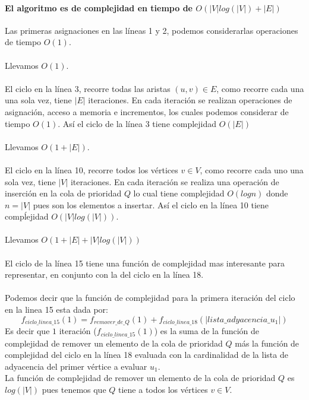 \documentclass[12pt]{article}
\begin{document}
\paragraph{El algoritmo es de complejidad en tiempo de $O(|V|log(|V|) + |E|)$}
Las primeras asignaciones en las líneas 1 y 2, podemos considerarlas operaciones de tiempo $O(1)$.\\\\
Llevamos $O(1)$.\\\\
El ciclo en la línea 3, recorre todas las aristas $(u,v)\in E$, como recorre cada una una sola vez, tiene $|E|$ iteraciones. En cada iteración se realizan operaciones de asignación, acceso a memoria e incrementos, los cuales podemos considerar de tiempo $O(1)$. Así el ciclo de la línea 3 tiene complejidad $O(|E|)$\\\\
Llevamos $O(1 + |E|)$.\\\\
El ciclo en la línea 10, recorre todos los vértices $v\in V$, como recorre cada uno una sola vez, tiene $|V|$ iteraciones. En cada iteración se realiza una operación de inserción en la cola de prioridad $Q$ lo cual tiene complejidad $O(logn)$ donde $n=|V|$ pues son los elementos a insertar. Así el ciclo en la línea 10 tiene compĺejidad $O(|V|log(|V|))$.\\\\
Llevamos $O(1 + |E| + |V|log(|V|))$\\\\
El ciclo de la línea 15 tiene una función de complejidad mas interesante para representar, en conjunto con la del ciclo en la línea 18.\\\pagebreak\\
Podemos decir que la función de complejidad para la primera iteración del ciclo en la linea 15 esta dada por:\\
\begin{equation}
f_{ciclo\_linea\_15}(1)= f_{remover\_de\_Q}(1) + f_{ciclo\_linea\_18}(|lista\_adyacencia\_u_1|)
\end{equation}
Es decir que $1$ iteración ($f_{ciclo\_linea\_15}(1)$) es la suma de la función de complejidad de remover un elemento de la cola de prioridad $Q$ más la función de complejidad del ciclo en la línea 18 evaluada con la cardinalidad de la lista de adyacencia del primer vértice a evaluar $u_1$.\\
La función de complejidad de remover un elemento de la cola de prioridad $Q$ es $log(|V|)$ pues tenemos que $Q$ tiene a todos los vértices $v \in V$.\\
\end{document}
